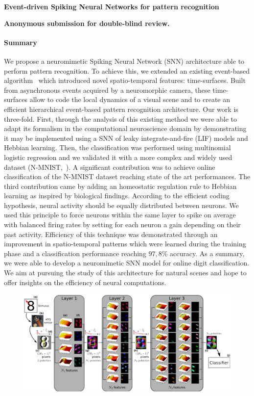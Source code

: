 \documentclass[12pt]{article}
\newcommand{\citet}[1]{\textcite{#1}}
\newcommand{\AuthorAG}{Antoine Grimaldi}
\newcommand{\AuthorLP}{Laurent Perrinet}
\newcommand{\AuthorVB}{Victor Boutin}
\newcommand{\AddressLP}{Institut de Neurosciences de la Timone (UMR 7289); Aix Marseille Univ, CNRS; Marseille, France}%
\newcommand{\AuthorSI}{Sio-Hoi Ieng}
\newcommand{\AuthorRB}{Ryad Benosman}%
\newcommand{\AddressRB}{Sorbonne Université, INSERM, CNRS, Institut de la Vision, France;}%
\newcommand{\Summary}{ %

We propose a neuromimetic Spiking Neural Network (SNN) architecture able to perform pattern recognition. %
To achieve this, we extended an existing event-based algorithm~\citet{Lagorce17} which introduced novel spatio-temporal features: time-surfaces. Built from asynchronous events acquired by a neuromorphic camera, these time-surfaces allow to code the local dynamics of a visual scene and to create an efficient hierarchical event-based pattern recognition architecture.
Our work is three-fold. First, through the analysis of this existing method we were able to adapt its formalism in the computational neuroscience domain by demonstrating it may be implemented using a SNN of leaky integrate-and-fire (LIF) models and Hebbian learning.
Then, the classification was performed using multinomial logistic regression %
and we validated it with a more complex and widely used dataset (N-MNIST,~\citet{Orchard15}).
A significant contribution was to achieve online classification of the N-MNIST dataset reaching state of the art performances. %
The third contribution came by adding an homeostatic regulation rule to Hebbian learning as inspired by biological findings.
 According to the efficient coding hypothesis, neural activity should be equally distributed between neurons. 
We used this principle to force neurons within the same layer to spike on average with balanced firing rates by setting for each neuron a gain depending on their past activity. Efficiency of this technique was demonstrated through an improvement in spatio-temporal patterns which were learned during the training phase and a classification performance reaching $97,8\%$ accuracy. As a summary, %
we were able to develop a neuromimetic SNN model for online digit classification. We aim at pursuing the study of this architecture for natural scenes and hope to offer insights on the efficiency of neural computations.
}
\begin{document}
{\Large\bf
Event-driven Spiking Neural Networks %
for
pattern recognition
}

{\bf
Anonymous submission for double-blind review.
}
%

\paragraph*{Summary}
\Summary
%
\begin{figure}
\vspace{-15pt}
\includegraphics[width=1.04\linewidth]{../notebooks/fig/hots.png}
\vspace{-45pt}
\caption*
{\label{fig:fig1}
}
\end{figure}
\end{document}
